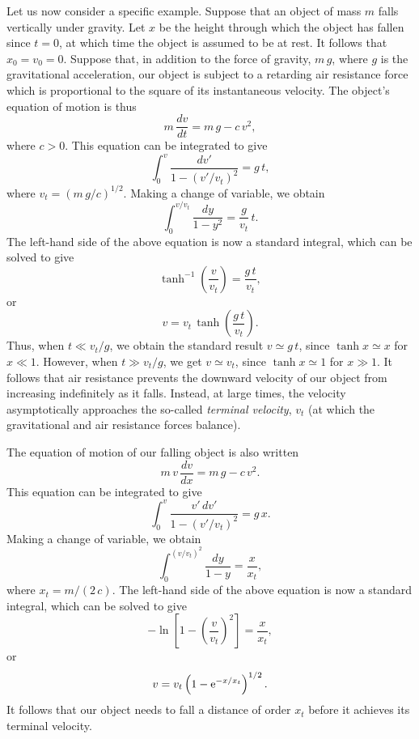 Let us now consider a specific example. Suppose that an object of mass $m$ falls
vertically under gravity. Let $x$ be the height through which the object
has fallen since $t=0$, at which time the object is assumed to be at rest. It follows that
$x_0=v_0=0$. Suppose that, in addition to the force of gravity, $m\,g$, where $g$ is the gravitational acceleration, our
object is subject to a retarding air resistance force which is proportional
to the square of its instantaneous velocity. The object's equation
of motion is thus
\begin{equation}
m\,\frac{dv}{dt} = m\, g - c\,v^2,
\end{equation}
where $c>0$. This equation can be integrated to give
\begin{equation}
\int_0^v \frac{dv'}{1-(v'/v_t)^2} = g\,t,
\end{equation}
where $v_t=(m\,g/c)^{1/2}$. Making a change of variable, we obtain
\begin{equation}
\int_0^{v/v_t}\frac{dy}{1-y^2} = \frac{g}{v_t}\,t.
\end{equation}
The left-hand side of the above equation is now a standard integral, which can be solved to give
\begin{equation}
\tanh^{-1}\left(\frac{v}{v_t}\right) = \frac{g\,t}{v_t},
\end{equation}
or
\begin{equation}
 v = v_t\,\tanh\left(\frac{g\,t}{v_t}\right).
 \end{equation}
 Thus, when $t\ll v_t/g$, we obtain the standard result $v\simeq g\,t$,
 since $\tanh x\simeq x$ for $x\ll 1$. However, when $t\gg v_t/g$, we get
 $v\simeq v_t$, since $\tanh x\simeq 1$ for $x\gg 1$. It follows that
 air resistance prevents the downward velocity of our object from
 increasing indefinitely as it falls. Instead, at large times, the velocity asymptotically approaches
 the so-called {\em terminal velocity}, $v_t$ (at which the gravitational
 and air resistance forces balance). 
 
 The equation of motion of our falling object is also  written
 \begin{equation}
 m\,v\,\frac{dv}{dx} = m\,g - c\,v^2.
 \end{equation}
 This equation can be integrated to give
 \begin{equation}
 \int_0^v\frac{v'\,dv'}{1-(v'/v_t)^2} = g\,x.
 \end{equation}
 Making a change of variable, we obtain
 \begin{equation}
 \int_0^{(v/v_t)^2} \frac{dy}{1-y} = \frac{x}{x_t},
 \end{equation}
 where $x_t = m/ (2\,c)$. The left-hand side of the above equation is now a standard integral, which can
 be solved to give
 \begin{equation}
 -\ln\!\left[1-\left(\frac{v}{v_t}\right)^2\right] = \frac{x}{x_t},
\end{equation}
or
\begin{equation}
v = v_t\left(1-{\rm e}^{-x/x_t}\right)^{1/2}.
\end{equation}
It follows  that our object needs to fall a distance
of order $x_t$ before it achieves its terminal velocity.

